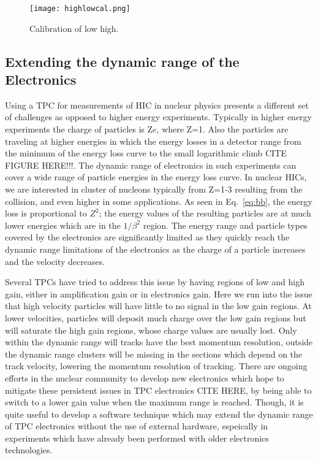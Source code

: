 \begin{figure}[H]
\texttt{[image: highlowcal.png]}
\caption{Calibration of low high.}
\label{fig:highlowcal}
\end{figure}


\subsection{Extending the dynamic range of the Electronics}
Using a TPC for measurements of HIC in nuclear physics presents a different set of challenges as opposed to higher energy experiments. Typically in higher energy experiments the charge of particles is Z$e$, where Z=1. Also the particles are traveling at higher energies in which the energy losses in a detector range from the minimum of the energy loss curve to the small logarithmic climb CITE FIGURE HERE!!!. The dynamic range of electronics in such experiments can cover a wide range of particle energies in the energy loss curve. In nuclear HICs, we are interested in cluster of nucleons typically from Z=1-3 resulting from the collision, and even higher in some applications. As seen in Eq.~\ref{eq:bb}, the energy loss is proportional to $Z^2$; the energy values of the resulting particles are at much lower energies which are in the $1/\beta^2$ region. The energy range and particle types covered by the electronics are significantly limited as they quickly reach the dynamic range limitations of the electronics as the charge of a particle increases and the velocity decreases. 

Several TPCs have tried to address this issue by having regions of low and high gain, either in amplification gain or in electronics gain. Here we run into the issue that high velocity particles will have little to no signal in the low gain regions. At lower velocities, particles will deposit much charge over the low gain regions but will saturate the high gain regions, whose charge values are usually lost. Only within the dynamic range will tracks have the best momentum resolution, outside the dynamic range clusters will be missing in the sections which depend on the track velocity, lowering the momentum resolution of tracking. There are ongoing efforts in the nuclear community to develop new electronics which hope to mitigate these persistent issues in TPC electronics CITE HERE, by being able to switch to a lower gain value when the maximum range is reached. Though, it is quite useful to develop a software technique which may extend the dynamic range of TPC electronics without the use of external hardware, espeically in experiments which have already been performed with older electronics technologies. 

